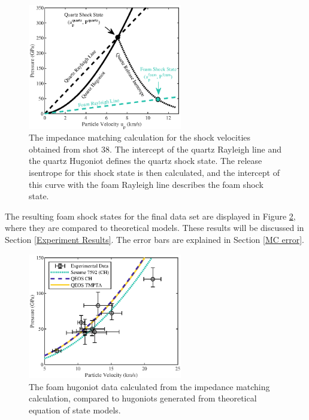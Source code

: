 \begin{figure} [h]
\begin{centering}
\includegraphics[width=0.6\textwidth]{figures/Experiment/ImpedanceMatch.eps}%
\caption{\label{fig:Impedance Match} The impedance matching calculation for the shock velocities obtained from shot 38. The intercept of the quartz Rayleigh line and the quartz Hugoniot defines the quartz shock state. The release isentrope for this shock state is then calculated, and the intercept of this curve with the foam Rayleigh line describes the foam shock state.}
\end{centering}
\end{figure}

The resulting foam shock states for the final data set are displayed in Figure \ref{fig:Hugoniot}, where they are compared to theoretical models. These results will be discussed in Section \ref{Experiment Results}. The error bars are explained in Section \ref{MC error}.

\begin{figure} [h]
\begin{centering}
\includegraphics[width=0.6\textwidth]{figures/Experiment/Hugoniot.eps}%
\caption{\label{fig:Hugoniot} The foam hugoniot data calculated from the impedance matching calculation, compared to hugoniots generated from theoretical equation of state models.}
\end{centering}
\end{figure}


